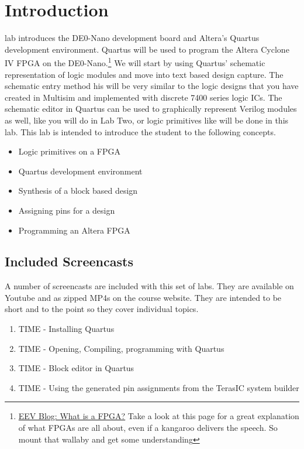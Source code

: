 \documentclass[12pt,journal]{IEEEtran}
\begin{document}




  \section{Introduction}
     lab introduces the DE0-Nano development board and Altera's Quartus development environment. Quartus will be used to program the Altera Cyclone IV FPGA on the DE0-Nano.\footnote{\href{https://www.youtube.com/watch?v=gUsHwi4M4xE}{EEV Blog: What is a FPGA?} Take a look at this page for a great explanation of what FPGAs are all about, even if a kangaroo delivers the speech. So mount that wallaby and get some understanding} We will start by using Quartus' schematic representation of logic modules and move into text based design capture. The schematic entry method his will be very similar to the logic designs that you have created in Multisim and implemented with discrete 7400 series logic ICs. The schematic editor in Quartus can be used to graphically represent Verilog modules as well, like you will do in Lab Two, or logic primitives like will be done in this lab. This lab is intended to introduce the student to the following concepts.
    \begin{itemize}
       \item Logic primitives on a FPGA
       \item Quartus development environment
       \item Synthesis of a block based design
       \item Assigning pins for a design
       \item Programming an Altera FPGA
    \end{itemize}

    \subsection{Included Screencasts}
      A number of screencasts are included with this set of labs. They are available on Youtube and as zipped MP4s on the course website. They are intended to be short and to the point so they cover individual topics.
      \begin{enumerate}
        \item TIME - Installing Quartus
        \item TIME - Opening, Compiling, programming with Quartus
        \item TIME - Block editor in Quartus
        \item TIME - Using the generated pin assignments from the TerasIC system builder
      \end{enumerate}
\end{document}
